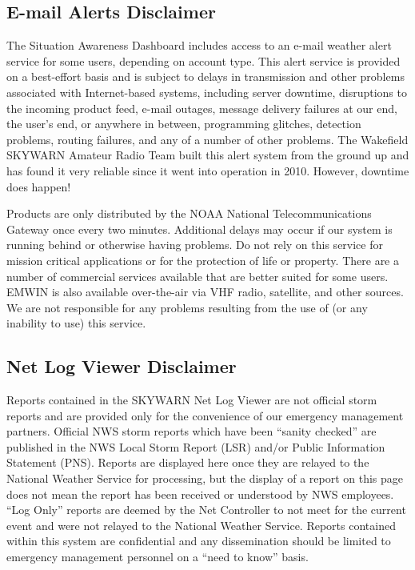 \documentclass[pdflatex,letterpaper,twoside,12pt]{book}
\begin{document}
\subsection{E-mail Alerts Disclaimer}
The Situation Awareness Dashboard includes access to an e-mail weather alert service for some users, depending on account type.  This alert service is provided on a best-effort basis and is subject to delays in transmission and other problems associated with Internet-based systems, including server downtime, disruptions to the incoming product feed, e-mail outages, message delivery failures at our end, the user's end, or anywhere in between, programming glitches, detection problems, routing failures, and any of a number of other problems.  The Wakefield SKYWARN Amateur Radio Team built this alert system from the ground up and has found it very reliable since it went into operation in 2010.  However, downtime does happen!

Products are only distributed by the NOAA National Telecommunications Gateway once every two minutes. Additional delays may occur if our system is running behind or otherwise having problems.  Do not rely on this service for mission critical applications or for the protection of life or property.  There are a number of commercial services available that are better suited for some users. EMWIN is also available over-the-air via VHF radio, satellite, and other sources.  We are not responsible for any problems resulting from the use of (or any inability to use) this service.

\subsection{Net Log Viewer Disclaimer}

Reports contained in the SKYWARN Net Log Viewer are not official storm reports and are provided only for the convenience of our emergency management partners. Official NWS storm reports which have been ``sanity checked'' are published in the NWS Local Storm Report (LSR) and/or Public Information Statement (PNS). Reports are displayed here once they are relayed to the National Weather Service for processing, but the display of a report on this page does not mean the report has been received or understood by NWS employees.  ``Log Only'' reports are deemed by the Net Controller to not meet  for the current event and were not relayed to the National Weather Service.  Reports contained within this system are confidential and any dissemination should be limited to emergency management personnel on a ``need to know'' basis.
\end{document}
